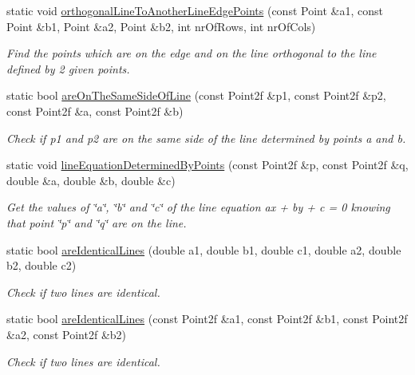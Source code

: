 \begin{DoxyCompactItemize}
static void \hyperlink{classmultiscale_1_1Geometry2D_a3da27e8cecb0a0d2733afa85d356a912}{orthogonal\-Line\-To\-Another\-Line\-Edge\-Points} (const Point \&a1, const Point \&b1, Point \&a2, Point \&b2, int nr\-Of\-Rows, int nr\-Of\-Cols)
\begin{DoxyCompactList}\small\item\em Find the points which are on the edge and on the line orthogonal to the line defined by 2 given points. \end{DoxyCompactList}\item 
static bool \hyperlink{classmultiscale_1_1Geometry2D_a828b7b579420ac06dabd7c4ba4d081ae}{are\-On\-The\-Same\-Side\-Of\-Line} (const Point2f \&p1, const Point2f \&p2, const Point2f \&a, const Point2f \&b)
\begin{DoxyCompactList}\small\item\em Check if p1 and p2 are on the same side of the line determined by points a and b. \end{DoxyCompactList}\item 
static void \hyperlink{classmultiscale_1_1Geometry2D_a6d72740d7f1b2441b0829c0f0c6a6853}{line\-Equation\-Determined\-By\-Points} (const Point2f \&p, const Point2f \&q, double \&a, double \&b, double \&c)
\begin{DoxyCompactList}\small\item\em Get the values of \char`\"{}a\char`\"{}, \char`\"{}b\char`\"{} and \char`\"{}c\char`\"{} of the line equation ax + by + c = 0 knowing that point \char`\"{}p\char`\"{} and \char`\"{}q\char`\"{} are on the line. \end{DoxyCompactList}\item 
static bool \hyperlink{classmultiscale_1_1Geometry2D_aaa19f84365e924bacfad4ea893875a42}{are\-Identical\-Lines} (double a1, double b1, double c1, double a2, double b2, double c2)
\begin{DoxyCompactList}\small\item\em Check if two lines are identical. \end{DoxyCompactList}\item 
static bool \hyperlink{classmultiscale_1_1Geometry2D_a718faf02b261c9ccbedf9d7b0e19ada1}{are\-Identical\-Lines} (const Point2f \&a1, const Point2f \&b1, const Point2f \&a2, const Point2f \&b2)
\begin{DoxyCompactList}\small\item\em Check if two lines are identical. \end{DoxyCompactList}\item 

\end{DoxyCompactItemize}
